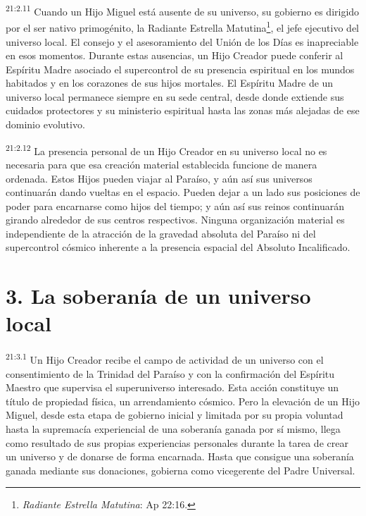 \par
\textsuperscript{21:2.11} Cuando un Hijo Miguel está ausente de su universo, su gobierno es dirigido por el ser nativo primogénito, la Radiante Estrella Matutina\footnote{\textit{Radiante Estrella Matutina}: Ap 22:16.}, el jefe ejecutivo del universo local. El consejo y el asesoramiento del Unión de los Días es inapreciable en esos momentos. Durante estas ausencias, un Hijo Creador puede conferir al Espíritu Madre asociado el supercontrol de su presencia espiritual en los mundos habitados y en los corazones de sus hijos mortales. El Espíritu Madre de un universo local permanece siempre en su sede central, desde donde extiende sus cuidados protectores y su ministerio espiritual hasta las zonas más alejadas de ese dominio evolutivo.

\par
\textsuperscript{21:2.12} La presencia personal de un Hijo Creador en su universo local no es necesaria para que esa creación material establecida funcione de manera ordenada. Estos Hijos pueden viajar al Paraíso, y aún así sus universos continuarán dando vueltas en el espacio. Pueden dejar a un lado sus posiciones de poder para encarnarse como hijos del tiempo; y aún así sus reinos continuarán girando alrededor de sus centros respectivos. Ninguna organización material es independiente de la atracción de la gravedad absoluta del Paraíso ni del supercontrol cósmico inherente a la presencia espacial del Absoluto Incalificado.

\section*{3. La soberanía de un universo local}
\par
\textsuperscript{21:3.1} Un Hijo Creador recibe el campo de actividad de un universo con el consentimiento de la Trinidad del Paraíso y con la confirmación del Espíritu Maestro que supervisa el superuniverso interesado. Esta acción constituye un título de propiedad física, un arrendamiento cósmico. Pero la elevación de un Hijo Miguel, desde esta etapa de gobierno inicial y limitada por su propia voluntad hasta la supremacía experiencial de una soberanía ganada por sí mismo, llega como resultado de sus propias experiencias personales durante la tarea de crear un universo y de donarse de forma encarnada. Hasta que consigue una soberanía ganada mediante sus donaciones, gobierna como vicegerente del Padre Universal.

